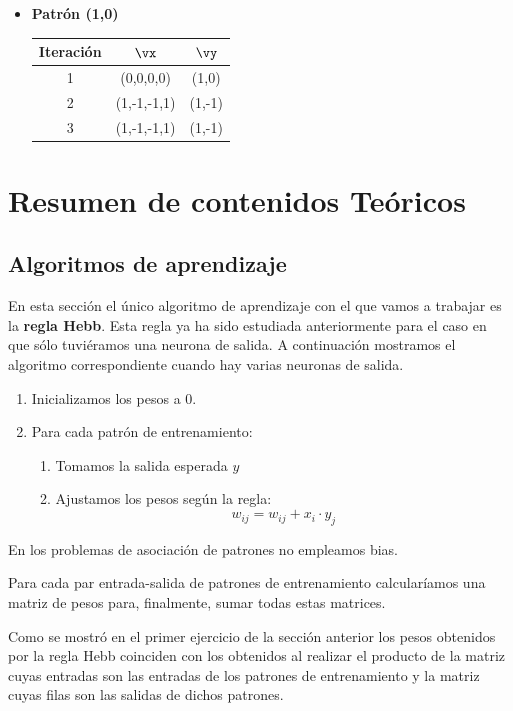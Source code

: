 \begin{problem}[11]
\begin{multicols}{2}
\begin{itemize}
\item \textbf{Patrón (1,0)}

\begin{tabular}{|ccc|}
\hline
\textbf{Iteración} & $\vx$ & $\vy$ \\
\hline
1 & (0,0,0,0) & (1,0) \\
\hline
2 & (1,-1,-1,1) & (1,-1) \\
\hline
3 & (1,-1,-1,1) & (1,-1) \\
\hline
\end{tabular}
\end{itemize}
\end{multicols}
\end{problem}

\section{Resumen de contenidos Teóricos}
\subsection{Algoritmos de aprendizaje}
En esta sección el único algoritmo de aprendizaje con el que vamos a trabajar es la \textbf{regla Hebb}. Esta regla ya ha sido estudiada anteriormente para el caso en que sólo tuviéramos una neurona de salida. A continuación mostramos el algoritmo correspondiente cuando hay varias neuronas de salida.
\begin{enumerate}
\item Inicializamos los pesos a 0.
\item Para cada patrón de entrenamiento:
\begin{enumerate}
\item Tomamos la salida esperada $y$
\item Ajustamos los pesos según la regla:
\[w_{ij} = w_{ij} + x_i\cdot y_j\]
\end{enumerate}
\end{enumerate}

\obs En los problemas de asociación de patrones no empleamos bias.

Para cada par entrada-salida de patrones de entrenamiento calcularíamos una matriz de pesos para, finalmente, sumar todas estas matrices.

Como se mostró en el primer ejercicio de la sección anterior los pesos obtenidos por la regla Hebb coinciden con los obtenidos al realizar el producto de la matriz cuyas entradas son las entradas de los patrones de entrenamiento y la matriz cuyas filas son las salidas de dichos patrones.

